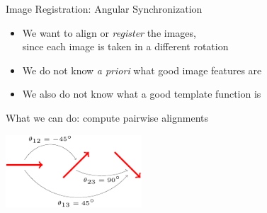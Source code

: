 \documentclass[10pt]{beamer}
\begin{document}
\begin{frame}{Image Registration: Angular Synchronization}

\begin{itemize}
\item We want to align or {\em register} the images, \\since each image is taken in a different rotation
\item We do not know {\em a priori} what good image features are
\item We also do not know what a good template function is
\end{itemize}

\vspace{0.1in}
\begin{center}
\textcolor{bold}{What we can do:} compute pairwise alignments

\vspace{0.1in}
\includegraphics[width=2in]{synchronization1}
\end{center}

\end{frame}
\end{document}
